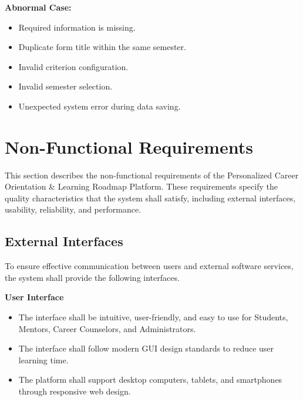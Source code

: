 \vspace{0.2cm}

\textbf{Abnormal Case:}

\begin{itemize}
    \item Required information is missing.
    \item Duplicate form title within the same semester.
    \item Invalid criterion configuration.
    \item Invalid semester selection.
    \item Unexpected system error during data saving.
\end{itemize}


\section{Non-Functional Requirements}

This section describes the non-functional requirements of the Personalized Career Orientation \& Learning Roadmap Platform. These requirements specify the quality characteristics that the system shall satisfy, including external interfaces, usability, reliability, and performance.

\subsection{External Interfaces}

To ensure effective communication between users and external software services, the system shall provide the following interfaces.

\textbf{User Interface}

\begin{itemize}
    \item The interface shall be intuitive, user-friendly, and easy to use for Students, Mentors, Career Counselors, and Administrators.
    \item The interface shall follow modern GUI design standards to reduce user learning time.
    \item The platform shall support desktop computers, tablets, and smartphones through responsive web design.
\end{itemize}

